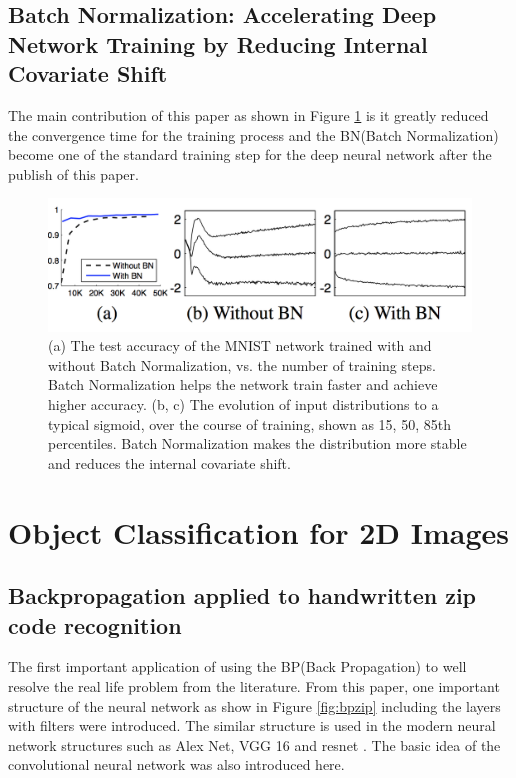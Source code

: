 \documentclass[a4paper,12pt]{article}
\begin{document}
\subsection{Batch Normalization: Accelerating Deep Network Training by Reducing
               Internal Covariate Shift\cite{DBLP:journals/corr/IoffeS15}}
The main contribution of this paper as shown in Figure \ref{fig:bp} is it greatly reduced the convergence time for the training process and the BN(Batch Normalization) become one of the standard training step for the deep neural network after the publish of this paper.\\
\begin{figure}[H]
  \begin{center}
      \includegraphics[scale=0.6]{bn.png}
\end{center}
\caption{(a) The test accuracy of the MNIST network trained with and without Batch Normalization, vs. the number of training steps. Batch Normalization helps the network train faster and achieve higher accuracy\cite{DBLP:journals/corr/IoffeS15}. (b, c) The evolution of input distributions to a typical sigmoid, over the course of training, shown as  15, 50, 85th percentiles. Batch Normalization makes the distribution more stable and reduces the internal covariate shift\cite{DBLP:journals/corr/IoffeS15}.}
 \label{fig:bp}
 \end{figure}


\section{Object Classification for 2D Images}
\subsection{Backpropagation applied to handwritten zip code recognition\cite{doi:10.1162/neco.1989.1.4.541}}
The first important application of using the BP(Back Propagation) to well resolve the real life problem from the literature. From this paper, one important structure of the neural network as show in Figure \ref{fig:bpzip} including the layers with filters were introduced. The similar structure is used in the modern neural network structures such as Alex Net\cite{NIPS2012_4824}, VGG 16  \cite{SimonyanZ14a} and resnet \cite{DBLP:journals/corr/HeZRS15}. The basic idea of the convolutional neural network was also introduced here.\\
\end{document}
